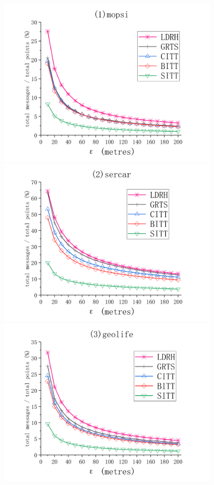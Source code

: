 {\begin{figure}[tb!]
	\centering
	\includegraphics[scale = 0.210]{figures/Fig-mopsi-total-messages.png}\hspace{1ex}
	\includegraphics[scale = 0.210]{figures/Fig-sercar-total-messages.png}\hspace{1ex}
	\includegraphics[scale = 0.210]{figures/Fig-geolife-total-messages.png}\hspace{1ex}

\end{figure}}

